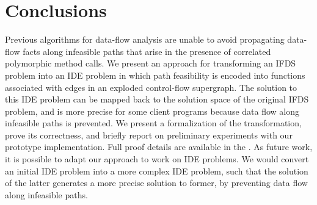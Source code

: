 \section{Conclusions}
  \label{sec:Conclusions}
  
Previous algorithms for data-flow analysis are unable to avoid propagating
data-flow facts along infeasible paths that arise in the presence of
correlated polymorphic method calls. 
We present an approach for transforming an IFDS problem into an IDE problem
in which path feasibility is encoded into functions associated
with edges in an exploded control-flow supergraph. The solution to this
IDE problem can be mapped back to the solution space of the original IFDS
problem, and is more precise for some client programs because data flow along
infeasible paths is prevented. We present a formalization of the
transformation, prove its correctness, and briefly report on
preliminary experiments with our prototype implementation. Full proof
details are available in the \reportOrAppendix.
As future work, it is possible to adapt our approach to work on IDE
problems. We would convert an initial IDE problem into a more complex IDE problem, 
such that the solution of the latter generates a more precise
solution to former, by preventing data flow along infeasible paths.
